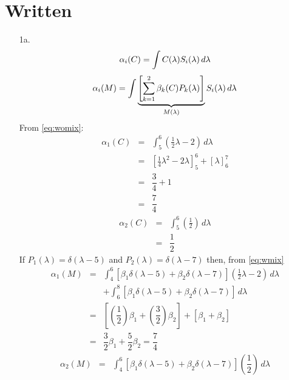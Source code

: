 \documentclass[10pt, a4paper]{article}
\begin{document}

\section{Written}
\begin{enumerate}
  \item[1a. ]
    \begin{equation} \label{eq:womix}
      \alpha_i(C) = \int C(\lambda) S_{i}(\lambda)\, d\lambda \\
    \end{equation}
    \begin{equation} \label{eq:wmix}
      \alpha_i(M) = \int \underbrace{\left[\sum_{k=1}^{2}\beta_{k}(C)P_{k}(\lambda) \right]}_{M(\lambda)}S_i(\lambda)\, d\lambda \\
    \end{equation}
    From \eqref{eq:womix}:
    \begin{eqnarray}
      \alpha_1(C) &=& \int^{6}_{5} \left( \frac{1}{2}\lambda -2 \right) \, d\lambda \\
      &=& \left[\frac{1}{4}\lambda^{2} - 2\lambda \right]^{6}_{5} + \left[\lambda \right]^{7}_{6} \\
      &=& \dfrac{3}{4} + 1 \\
      &=& \dfrac{7}{4}
    \end{eqnarray}
    \begin{eqnarray}
      \alpha_2(C) &=& \int^6_5 \left(\frac{1}{2}\right) \, d\lambda \\
      &=& \dfrac{1}{2}
    \end{eqnarray}
    If
    $P_1(\lambda) = \delta (\lambda-5)$
    and
    $P_2(\lambda) = \delta (\lambda-7)$
    then, from \eqref{eq:wmix}
    \begin{eqnarray}
      \alpha_1(M) &=& \int^6_4 \left[\beta_1\delta(\lambda-5) + \beta_2\delta(\lambda-7)\right]\left(\frac{1}{2}\lambda-2\right)\,
      d\lambda \\
      && + \int^8_6\left[\beta_1\delta(\lambda-5) + \beta_2\delta(\lambda-7)\right]\,d\lambda \nonumber \\
      &=& \left[\left(\dfrac{1}{2}\right)\beta_1 + \left(\dfrac{3}{2}\right)\beta_2\right] + \left[\beta_1 + \beta_2 \right] \\
      &=& \dfrac{3}{2}\beta_1 + \dfrac{5}{2}\beta_2 = \dfrac{7}{4}
    \end{eqnarray}
    \begin{eqnarray}
      \alpha_2(M) &=& \int^6_4\left[\beta_1\delta(\lambda-5) + \beta_2\delta(\lambda-7)\right]\left(\dfrac{1}{2}\right)\,d\lambda \\

\end{eqnarray}
\end{enumerate}
\end{document}
